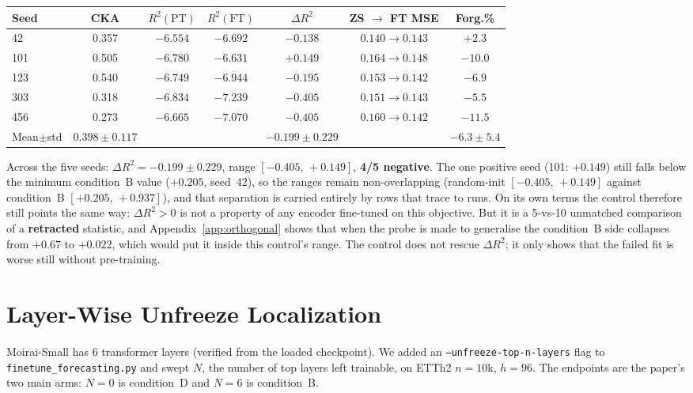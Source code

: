 \begin{center}
\small
\begin{tabular}{lcccccc}
\toprule
Seed & CKA & $R^2(\text{PT})$ & $R^2(\text{FT})$ & $\Delta R^2$ & ZS $\to$ FT MSE & Forg.\% \\
\midrule
42  & 0.357 & $-6.554$ & $-6.692$ & $-0.138$ & $0.140 \to 0.143$ & $+2.3$ \\
101 & 0.505 & $-6.780$ & $-6.631$ & $+0.149$ & $0.164 \to 0.148$ & $-10.0$ \\
123 & 0.540 & $-6.749$ & $-6.944$ & $-0.195$ & $0.153 \to 0.142$ & $-6.9$ \\
303 & 0.318 & $-6.834$ & $-7.239$ & $-0.405$ & $0.151 \to 0.143$ & $-5.5$ \\
456 & 0.273 & $-6.665$ & $-7.070$ & $-0.405$ & $0.160 \to 0.142$ & $-11.5$ \\
\midrule
Mean$\pm$std & $0.398{\pm}0.117$ & & & $-0.199{\pm}0.229$ & & $-6.3{\pm}5.4$ \\
\bottomrule
\end{tabular}
\end{center}

Across the five seeds: $\Delta R^2{=}{-}0.199{\pm}0.229$, range
$[-0.405,\,+0.149]$, \textbf{4/5 negative}.  The one positive seed
(101: $+0.149$) still falls below the minimum condition~B value
($+0.205$, seed~42), so the ranges remain non-overlapping
(random-init $[-0.405,\,+0.149]$ against condition~B $[+0.205,\,+0.937]$), and
that separation is carried entirely by rows that trace to runs.  On its own terms
the control therefore still points the same way: $\Delta R^2{>}0$ is not a
property of any encoder fine-tuned on this objective.  But it is a 5-vs-10
unmatched comparison of a \textbf{retracted} statistic, and
Appendix~\ref{app:orthogonal} shows that when the probe is made to generalise the
condition~B side collapses from $+0.67$ to $+0.022$, which would put it inside
this control's range.  The control does not rescue $\Delta R^2$; it only shows
that the failed fit is worse still without pre-training.

\section{Layer-Wise Unfreeze Localization}
\label{app:layerunfreeze}

Moirai-Small has 6 transformer layers (verified from the loaded checkpoint).
We added an \texttt{--unfreeze-top-n-layers} flag to
\texttt{finetune\_forecasting.py} and swept $N$, the number of top layers left
trainable, on ETTh2 $n{=}10$k, $h{=}96$.  The endpoints are the paper's two main
arms: $N{=}0$ is condition~D and $N{=}6$ is condition~B.

